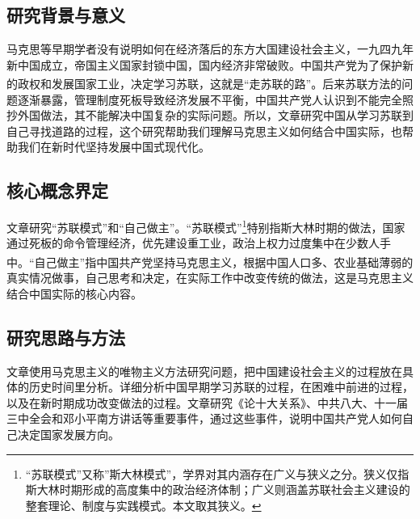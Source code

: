 \documentclass[12pt, a4paper]{ctexart}
\newcommand{\upcite}[1]{\textsuperscript{\cite{#1}}}
\numberwithin{table}{section}
\numberwithin{figure}{section}
\begin{document}
\subsection{研究背景与意义}
马克思等早期学者没有说明如何在经济落后的东方大国建设社会主义，一九四九年新中国成立，帝国主义国家封锁中国，国内经济非常破败。中国共产党为了保护新的政权和发展国家工业，决定学习苏联，这就是“走苏联的路”\upcite{ref1}。后来苏联方法的问题逐渐暴露，管理制度死板导致经济发展不平衡，中国共产党人认识到不能完全照抄外国做法，其不能解决中国复杂的实际问题。所以，文章研究中国从学习苏联到自己寻找道路的过程，这个研究帮助我们理解马克思主义如何结合中国实际，也帮助我们在新时代坚持发展中国式现代化。

\subsection{核心概念界定}
文章研究“苏联模式”和“自己做主”。“苏联模式”\footnote{“苏联模式”又称”斯大林模式”，学界对其内涵存在广义与狭义之分。狭义仅指斯大林时期形成的高度集中的政治经济体制；广义则涵盖苏联社会主义建设的整套理论、制度与实践模式。本文取其狭义。}特别指斯大林时期的做法，国家通过死板的命令管理经济，优先建设重工业，政治上权力过度集中在少数人手中\upcite{ref2}。“自己做主”指中国共产党坚持马克思主义，根据中国人口多、农业基础薄弱的真实情况做事，自己思考和决定，在实际工作中改变传统的做法，这是马克思主义结合中国实际的核心内容。

\subsection{研究思路与方法}
文章使用马克思主义的唯物主义方法研究问题，把中国建设社会主义的过程放在具体的历史时间里分析。详细分析中国早期学习苏联的过程，在困难中前进的过程，以及在新时期成功改变做法的过程。文章研究《论十大关系》、中共八大、十一届三中全会和邓小平南方讲话等重要事件，通过这些事件，说明中国共产党人如何自己决定国家发展方向。
\end{document}
